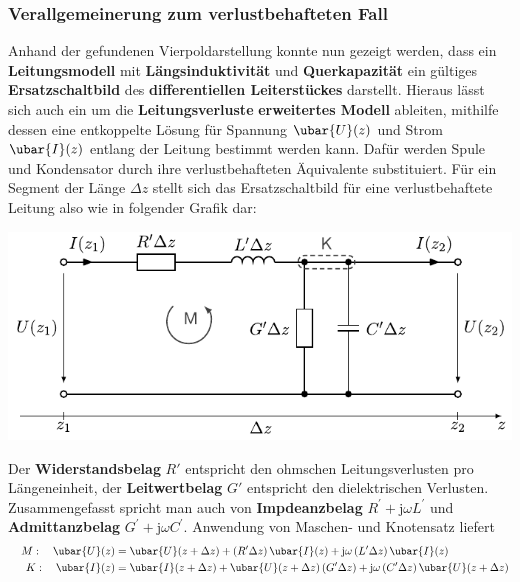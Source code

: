 \subsubsection{Verallgemeinerung zum verlustbehafteten Fall}
Anhand der gefundenen Vierpoldarstellung konnte nun gezeigt werden, dass ein \textbf{Leitungsmodell} mit \textbf{Längsinduktivität} und \textbf{Querkapazität} ein gültiges \textbf{Ersatzschaltbild} des \textbf{differentiellen Leiterstückes} darstellt. Hieraus lässt sich auch ein um die \textbf{Leitungsverluste} \textbf{erweitertes Modell} ableiten, mithilfe dessen eine entkoppelte Lösung für Spannung $\ubar{U}(z)$ und Strom $\ubar{I}(z)$ entlang der Leitung bestimmt werden kann. Dafür werden Spule und Kondensator durch ihre verlustbehafteten Äquivalente substituiert. Für ein Segment der Länge $\Delta z$ stellt sich das Ersatzschaltbild für eine verlustbehaftete Leitung also wie in folgender Grafik dar:
\begin{center}
	\includegraphics{res/LT4}
\end{center}
Der \textbf{Widerstandsbelag} $R'$ entspricht den ohmschen Leitungsverlusten pro Längeneinheit, der \textbf{Leitwertbelag} $G'$ entspricht den dielektrischen Verlusten. Zusammengefasst spricht man auch von \textbf{Impdeanzbelag} $R^{\prime}+\mathrm{j} \omega L^{\prime}$ und \textbf{Admittanzbelag} $G^{\prime}+\mathrm{j} \omega C^{\prime}$. Anwendung von Maschen- und Knotensatz liefert
\begin{align}
	&& M: \quad \ubar{U}(z)&=\ubar{U}(z+\Delta z)+\left(R^{\prime} \Delta z\right) \ubar{I}(z)+\mathrm{j} \omega\left(L^{\prime} \Delta z\right) \ubar{I}(z)  \\
	&& K: \quad \ubar{I}(z)&=\ubar{I}(z+\Delta z)+\ubar{U}(z+\Delta z)\left(G^{\prime} \Delta z\right)+\mathrm{j} \omega\left(C^{\prime} \Delta z\right) \ubar{U}(z+\Delta z) 
\end{align}
